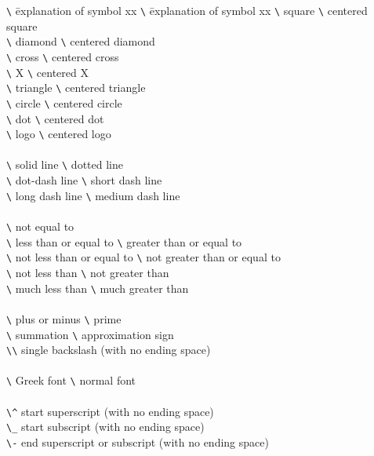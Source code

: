 \begin{center} \begin{tabbing}
\verb|\| \= explanation of symbol xx \=
\verb|\| \= explanation of symbol xx \kill
%
\verb|\| \> square \>
\verb|\| \> centered square \\
\verb|\| \> diamond \>
\verb|\| \> centered diamond \\
\verb|\| \> cross \>
\verb|\| \> centered cross \\
\verb|\| \> X \>
\verb|\| \> centered X \\
\verb|\| \> triangle \>
\verb|\| \> centered triangle \\
\verb|\| \> circle \>
\verb|\| \> centered circle \\
\verb|\| \> dot \>
\verb|\| \> centered dot \\
\verb|\| \> logo \>
\verb|\| \> centered logo \\
\\
\verb|\| \> solid line \>
\verb|\| \> dotted line \\
\verb|\| \> dot-dash line \>
\verb|\| \> short dash line \\
\verb|\| \> long dash line \>
\verb|\| \> medium dash line \\
\\
\verb|\| \> not equal to \\
\verb|\| \> less than or equal to \>
\verb|\| \> greater than or equal to \\
\verb|\| \> not less than or equal to \>
\verb|\| \> not greater than or equal to \\
\verb|\| \> not less than \>
\verb|\| \> not greater than \\
\verb|\| \> much less than \>
\verb|\| \> much greater than \\
\\
\verb|\| \> plus or minus \>
\verb|\| \> prime \\
\verb|\| \> summation \>
\verb|\| \> approximation sign \\
\verb|\\| \> single backslash (with no ending space) \\
\\
\verb|\| \> Greek font \>
\verb|\| \> normal font \\
\\
\verb|\^| \> start superscript (with no ending space) \\
\verb|\_| \> start subscript (with no ending space) \\
\verb|\-| \> end superscript or subscript (with no ending space) \\
\end{tabbing} \end{center}
